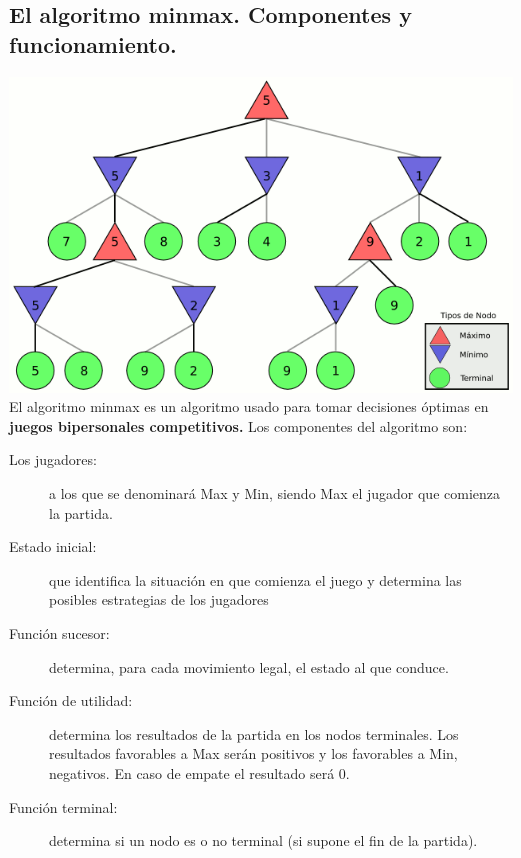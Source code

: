 \documentclass[a4paper, 11pt]{article}
\begin{document}
\subsection{El algoritmo minmax. Componentes y funcionamiento.}
\includegraphics[width=\textwidth]{minmax.png} 
El algoritmo minmax es un algoritmo usado para tomar decisiones óptimas en \textbf{juegos bipersonales competitivos.} Los componentes del algoritmo son:
\begin{description}

\item [Los jugadores:]a los que se denominará Max y Min, siendo Max el jugador que comienza la partida.
\item [Estado inicial:]que identifica la situación en que comienza el juego y determina las posibles estrategias de los jugadores
\item [Función sucesor:]determina, para cada movimiento legal, el estado al que conduce.
\item [Función de utilidad:]determina los resultados de la partida en los nodos terminales. Los resultados favorables a Max serán positivos y los favorables a Min, negativos. En caso de empate el resultado será 0.
\item [Función terminal:]determina si un nodo es o no terminal (si supone el fin de la partida).
\end{description}
\end{document}
